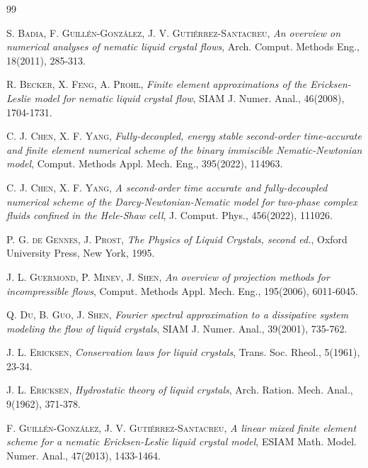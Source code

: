 \documentclass[12pt,reqno]{amsart}
\numberwithin{equation}{section}
\begin{document}
\begin{thebibliography}{99}


 \textsc{S. Badia, F. Guill\'en-Gonz\'alez, J. V. Guti\'errez-Santacreu}, \emph{An overview on numerical analyses of nematic liquid crystal flows}, Arch. Comput. Methods Eng., 18(2011), 285-313.

 \textsc{R. Becker, X. Feng, A. Prohl}, \emph{Finite element approximations of the Ericksen-Leslie model for nematic liquid crystal flow}, SIAM J. Numer. Anal., 46(2008), 1704-1731.


 \textsc{C. J. Chen, X. F. Yang}, \emph{Fully-decoupled, energy stable second-order time-accurate and finite element numerical scheme of the binary immiscible Nematic-Newtonian model}, Comput. Methods Appl. Mech. Eng., 395(2022), 114963.

 \textsc{C. J. Chen, X. F. Yang}, \emph{A second-order time accurate and fully-decoupled numerical scheme of the Darcy-Newtonian-Nematic model for two-phase complex fluids confined in the Hele-Shaw cell}, J. Comput. Phys., 456(2022), 111026.


 \textsc{P. G. de Gennes, J. Prost}, \emph{The Physics of Liquid Crystals, second ed.}, Oxford University Press, New York, 1995.

 \textsc{J. L. Guermond, P. Minev, J. Shen}, \emph{An overview of projection methods for incompressible flows}, Comput. Methods Appl. Mech. Eng., 195(2006), 6011-6045.


 \textsc{Q. Du, B. Guo, J. Shen}, \emph{Fourier spectral approximation to a dissipative system modeling the flow of liquid crystals}, SIAM J. Numer. Anal., 39(2001), 735-762.

 \textsc{J. L. Ericksen}, \emph{Conservation laws for liquid crystals}, Trans. Soc. Rheol., 5(1961), 23-34.


 \textsc{J. L. Ericksen}, \emph{Hydrostatic theory of liquid crystals}, Arch. Ration. Mech. Anal., 9(1962), 371-378.


 \textsc{F. Guill\'en-Gonz\'alez, J. V. Guti\'errez-Santacreu}, \emph{A linear mixed finite element scheme for a nematic Ericksen-Leslie liquid crystal model}, ESIAM Math. Model. Numer. Anal., 47(2013), 1433-1464.


\end{thebibliography}
\end{document}
